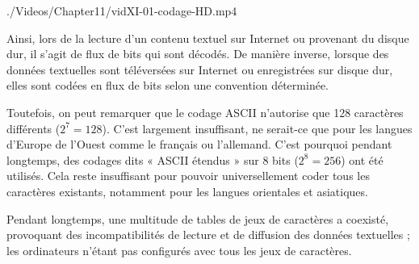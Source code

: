 \begin{marginvideo}
		{./Videos/Chapter11/vidXI-01-codage-HD.mp4}%
\end{marginvideo}

Ainsi, lors de la lecture d'un contenu textuel sur Internet ou provenant du disque dur, il s'agit de flux de bits qui sont décodés. De manière inverse, lorsque des données textuelles sont téléversées sur Internet ou enregistrées sur disque dur, elles sont codées en flux de bits selon une convention déterminée.

Toutefois, on peut remarquer que le codage ASCII n'autorise que 128 caractères différents ($2^7 = 128$). C'est largement insuffisant, ne serait-ce que pour les langues d'Europe de l'Ouest comme le français ou l'allemand. C'est pourquoi pendant longtemps, des codages dits « ASCII étendus » sur 8 bits ($2^8 = 256$) ont été utilisés. Cela reste insuffisant pour pouvoir universellement coder tous les caractères existants, notamment pour les langues orientales et asiatiques. 

Pendant longtemps, une multitude de tables de jeux de caractères a coexisté, provoquant des incompatibilités de lecture et de diffusion des données textuelles ; les ordinateurs n'étant pas configurés avec tous les jeux de caractères.

